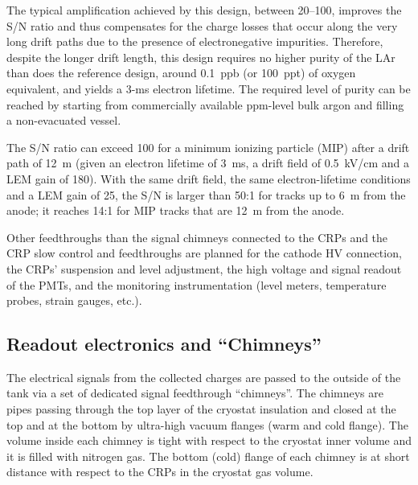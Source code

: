 The typical amplification achieved by this design, between 20--100, improves the S/N ratio and thus  compensates for the charge losses that occur along the very long drift paths due to the presence of  electronegative impurities. Therefore, despite the longer drift length, this design requires no higher 
purity of the LAr than does the reference design, around 0.1~ppb (or 100~ppt) of oxygen equivalent, and yields a 3-ms electron lifetime. The required level of purity can be reached by starting from  commercially available ppm-level bulk argon and filling a non-evacuated vessel\cite{WA105_TDR}.

The S/N ratio can exceed 100 for a minimum ionizing particle (MIP) after a drift path of 12~m (given an electron lifetime of 3~ms, a drift field of 0.5~kV/cm and a LEM gain of 180). With the same drift field, the same electron-lifetime conditions and a LEM gain of 25, the S/N is larger than 50:1 for tracks up to 6~m from the anode; it reaches 14:1 for MIP tracks that are 12~m from the anode.

Other feedthroughs than the signal chimneys connected to the CRPs and the CRP slow control and feedthroughs are planned for the cathode HV connection, the CRPs' suspension and level adjustment, the high voltage and signal readout of the PMTs, and the monitoring instrumentation (level meters, temperature probes, strain gauges, etc.).


\subsection{Readout electronics and ``Chimneys''}
\label{v4:fddp-ov:electronics}

The electrical signals from the collected charges are passed to the outside of the tank via a set of dedicated signal feedthrough ``chimneys''. The chimneys are pipes passing through the top layer of the cryostat insulation and closed at the top and at the bottom by ultra-high vacuum flanges (warm and cold flange). The volume inside each chimney is tight with respect to the cryostat inner volume and it is filled with nitrogen gas. The bottom (cold) flange of each chimney is at short distance with respect to the CRPs in the cryostat gas volume.


